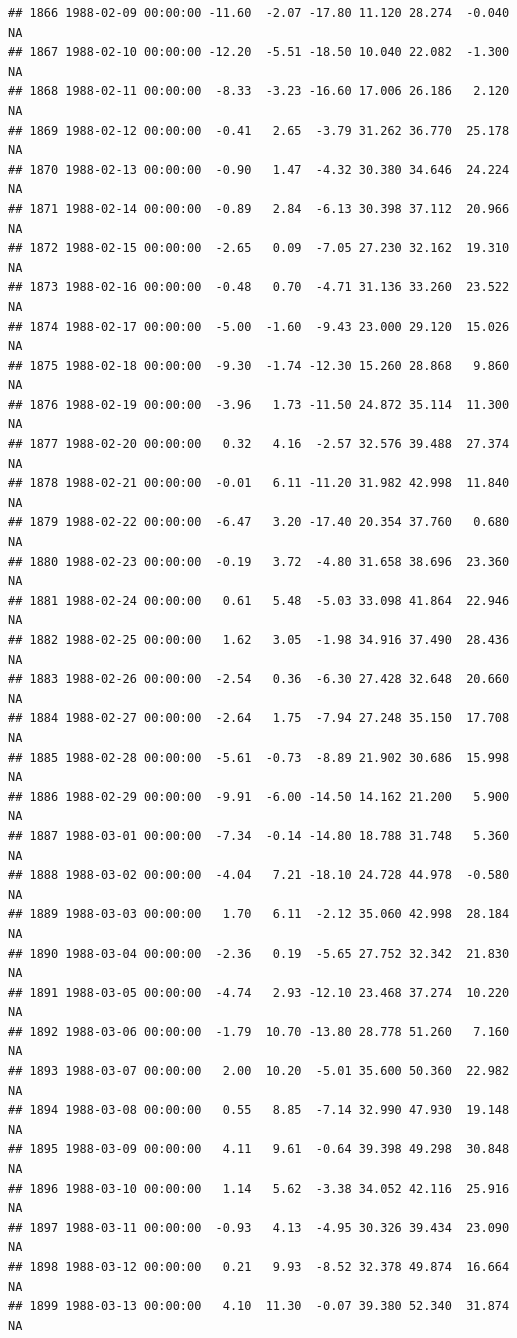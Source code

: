 \documentclass{article}\usepackage{graphicx, color}
\makeatletter
\newenvironment{kframe}{%
 \def\at@end@of@kframe{}%
 \ifinner\ifhmode%
  \def\at@end@of@kframe{\end{minipage}}%
  \begin{minipage}{\columnwidth}%
 \fi\fi%
 \def\FrameCommand##1{\hskip\@totalleftmargin \hskip-\fboxsep
 \colorbox{shadecolor}{##1}\hskip-\fboxsep
     \hskip-\linewidth \hskip-\@totalleftmargin \hskip\columnwidth}%
 \MakeFramed {\advance\hsize-\width
   \@totalleftmargin\z@ \linewidth\hsize
   \@setminipage}}%
 {\par\unskip\endMakeFramed%
 \at@end@of@kframe}
\newenvironment{knitrout}{}{} %
\makeatother
\begin{document}
\begin{knitrout}
\begin{kframe}
\begin{verbatim}
## 1866 1988-02-09 00:00:00 -11.60  -2.07 -17.80 11.120 28.274  -0.040     NA
## 1867 1988-02-10 00:00:00 -12.20  -5.51 -18.50 10.040 22.082  -1.300     NA
## 1868 1988-02-11 00:00:00  -8.33  -3.23 -16.60 17.006 26.186   2.120     NA
## 1869 1988-02-12 00:00:00  -0.41   2.65  -3.79 31.262 36.770  25.178     NA
## 1870 1988-02-13 00:00:00  -0.90   1.47  -4.32 30.380 34.646  24.224     NA
## 1871 1988-02-14 00:00:00  -0.89   2.84  -6.13 30.398 37.112  20.966     NA
## 1872 1988-02-15 00:00:00  -2.65   0.09  -7.05 27.230 32.162  19.310     NA
## 1873 1988-02-16 00:00:00  -0.48   0.70  -4.71 31.136 33.260  23.522     NA
## 1874 1988-02-17 00:00:00  -5.00  -1.60  -9.43 23.000 29.120  15.026     NA
## 1875 1988-02-18 00:00:00  -9.30  -1.74 -12.30 15.260 28.868   9.860     NA
## 1876 1988-02-19 00:00:00  -3.96   1.73 -11.50 24.872 35.114  11.300     NA
## 1877 1988-02-20 00:00:00   0.32   4.16  -2.57 32.576 39.488  27.374     NA
## 1878 1988-02-21 00:00:00  -0.01   6.11 -11.20 31.982 42.998  11.840     NA
## 1879 1988-02-22 00:00:00  -6.47   3.20 -17.40 20.354 37.760   0.680     NA
## 1880 1988-02-23 00:00:00  -0.19   3.72  -4.80 31.658 38.696  23.360     NA
## 1881 1988-02-24 00:00:00   0.61   5.48  -5.03 33.098 41.864  22.946     NA
## 1882 1988-02-25 00:00:00   1.62   3.05  -1.98 34.916 37.490  28.436     NA
## 1883 1988-02-26 00:00:00  -2.54   0.36  -6.30 27.428 32.648  20.660     NA
## 1884 1988-02-27 00:00:00  -2.64   1.75  -7.94 27.248 35.150  17.708     NA
## 1885 1988-02-28 00:00:00  -5.61  -0.73  -8.89 21.902 30.686  15.998     NA
## 1886 1988-02-29 00:00:00  -9.91  -6.00 -14.50 14.162 21.200   5.900     NA
## 1887 1988-03-01 00:00:00  -7.34  -0.14 -14.80 18.788 31.748   5.360     NA
## 1888 1988-03-02 00:00:00  -4.04   7.21 -18.10 24.728 44.978  -0.580     NA
## 1889 1988-03-03 00:00:00   1.70   6.11  -2.12 35.060 42.998  28.184     NA
## 1890 1988-03-04 00:00:00  -2.36   0.19  -5.65 27.752 32.342  21.830     NA
## 1891 1988-03-05 00:00:00  -4.74   2.93 -12.10 23.468 37.274  10.220     NA
## 1892 1988-03-06 00:00:00  -1.79  10.70 -13.80 28.778 51.260   7.160     NA
## 1893 1988-03-07 00:00:00   2.00  10.20  -5.01 35.600 50.360  22.982     NA
## 1894 1988-03-08 00:00:00   0.55   8.85  -7.14 32.990 47.930  19.148     NA
## 1895 1988-03-09 00:00:00   4.11   9.61  -0.64 39.398 49.298  30.848     NA
## 1896 1988-03-10 00:00:00   1.14   5.62  -3.38 34.052 42.116  25.916     NA
## 1897 1988-03-11 00:00:00  -0.93   4.13  -4.95 30.326 39.434  23.090     NA
## 1898 1988-03-12 00:00:00   0.21   9.93  -8.52 32.378 49.874  16.664     NA
## 1899 1988-03-13 00:00:00   4.10  11.30  -0.07 39.380 52.340  31.874     NA

\end{verbatim}
\end{kframe}
\end{knitrout}
\end{document}
